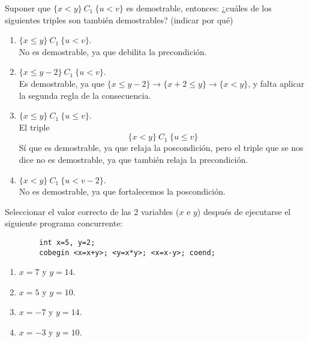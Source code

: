\begin{ejercicio}
    Suponer que $\{x<y\}\ C_1\ \{u<v\}$ es demostrable, entonces: ¿cuáles de los siguientes triples son también demostrables? (indicar por qué)
    \begin{enumerate}[label=(\alph*)]
        \item $\{x\leq y\}\ C_1\ \{u<v\}$.\\
            No es demostrable, ya que debilita la precondición.
        \item $\{x\leq y-2\}\ C_1\ \{u<v\}$.\\
            Es demostrable, ya que $\{x\leq y-2\}\rightarrow\{x+2\leq y\}\rightarrow\{x<y\}$, y falta aplicar la segunda regla de la consecuencia.
        \item $\{x\leq y\}\ C_1\ \{u\leq v\}$.\\
            El triple
            \begin{equation*}
                \{x<y\}\ C_1\ \{u\leq v\}
            \end{equation*}
            Sí que es demostrable, ya que relaja la poscondición, pero el triple que se nos dice no es demostrable, ya que también relaja la precondición.
        \item $\{x<y\}\ C_1\ \{u<v-2\}$.\\
            No es demostrable, ya que fortalecemos la poscondición.
    \end{enumerate}
\end{ejercicio}

\begin{ejercicio}
    Seleccionar el valor correcto de las 2 variables ($x$ e $y$) después de ejecutarse el siguiente programa concurrente:
    \begin{verbatim}
        int x=5, y=2;
        cobegin <x=x+y>; <y=x*y>; <x=x-y>; coend;
    \end{verbatim}
    \begin{enumerate}[label=(\alph*)]
        \item $x=7$ y $y=14$.
        \item $x=5$ y $y=10$.
        \item $x=-7$ y $y=14$.
        \item $x=-3$ y $y=10$.
    \end{enumerate}
\end{ejercicio}

